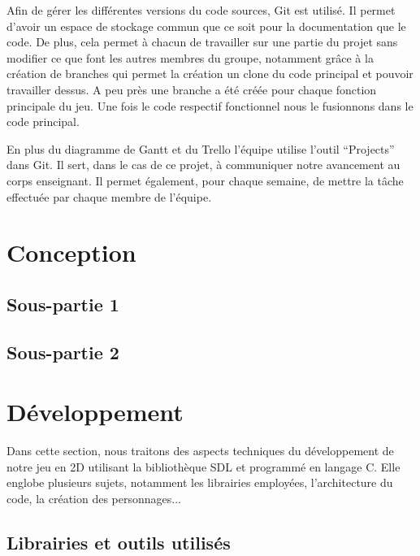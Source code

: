 \documentclass[a4paper,12pt]{article}
\begin{document}
Afin de gérer les différentes versions du code sources, Git est utilisé. 
Il permet d’avoir un espace de stockage commun que ce soit pour la documentation que le code. De plus, cela permet à chacun de travailler sur une partie du projet sans modifier ce que font les autres membres du groupe, notamment grâce à la création de branches qui permet la création un clone du code principal et pouvoir travailler dessus. 
A peu près une branche a été créée pour chaque fonction principale du jeu. Une fois le code respectif fonctionnel nous le fusionnons dans le code principal.

En plus du diagramme de Gantt et du Trello l’équipe utilise l’outil “Projects” dans Git. 
Il sert, dans le cas de ce projet, à communiquer notre avancement au corps enseignant. 
Il permet également, pour chaque semaine, de mettre la tâche effectuée par chaque membre de l’équipe.



\section{Conception}

\subsection{Sous-partie 1}

\subsection{Sous-partie 2}



\section{Développement}

Dans cette section, nous traitons des aspects techniques du développement de notre jeu en 2D utilisant la bibliothèque SDL et programmé en langage C. Elle englobe plusieurs sujets, notamment les librairies employées, l'architecture du code, la création des personnages...

\subsection{Librairies et outils utilisés}
\end{document}
